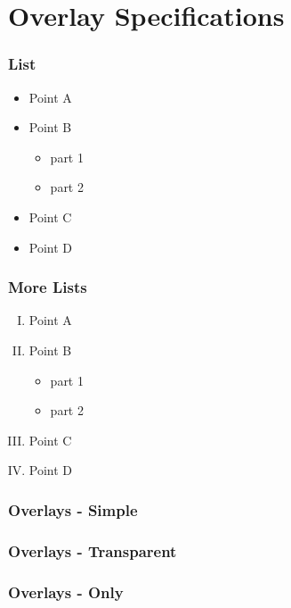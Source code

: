 \documentclass[14pt]{beamer}
\begin{document}
\section{Overlay Specifications}

\begin{frame}
\frametitle{List}
\begin{itemize}
	\pause
	\item Point A
	\pause
	\item Point B
	\begin{itemize}
		\pause
		\item part 1
		\pause
		\item part 2
	\end{itemize}
	\pause
	\item Point C
	\pause
	\item Point D
\end{itemize}
\end{frame}

\begin{frame}
\frametitle{More Lists}
\begin{enumerate}[(I)]
	\item<1-> Point A
	\item<2-> Point B
	\begin{itemize}
		\item<3-> part 1
		\item<4-> part 2
	\end{itemize}
	\item<5-> Point C
	\item<6-> Point D
\end{enumerate}
\end{frame}

\begin{frame}
\frametitle{Overlays - Simple}



\end{frame}

\begin{frame}
\frametitle{Overlays - Transparent}



\end{frame}

\begin{frame}
\frametitle{Overlays - Only}


\end{frame}
\end{document}
